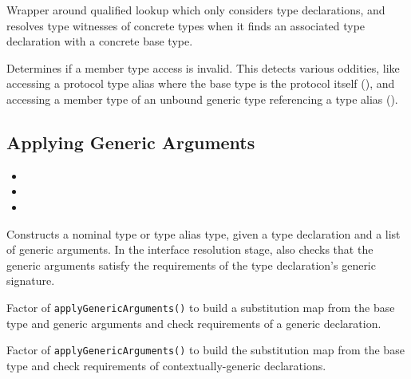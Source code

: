 \documentclass[../generics]{subfiles}
\begin{document}
Wrapper around qualified lookup which only considers type declarations, and resolves type witnesses of concrete types when it finds an associated type declaration with a concrete base type.

Determines if a member type access is invalid. This detects various oddities, like accessing a protocol type alias where the base type is the protocol itself (), and accessing a member type of an unbound generic type referencing a type alias ().

\subsection*{Applying Generic Arguments}

\begin{itemize}
\item {}
\item {}
\item {}
\end{itemize}

Constructs a nominal type or type alias type, given a type declaration and a list of generic arguments. In the interface resolution stage, also checks that the generic arguments satisfy the requirements of the type declaration's generic signature.

Factor of \texttt{applyGenericArguments()} to build a substitution map from the base type and generic arguments and check requirements of a generic declaration.

Factor of \texttt{applyGenericArguments()} to build the substitution map from the base type and check requirements of contextually-generic declarations.
\end{document}
